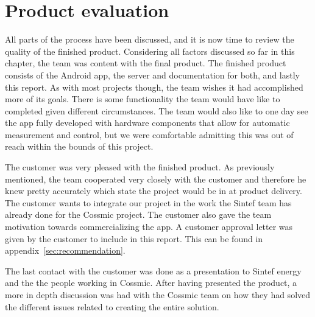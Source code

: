 \section{Product evaluation}
All parts of the process have been discussed, and it is now time to review the quality of the finished product. Considering all factors discussed so far in this chapter, the team was content with the final product. The finished product consists of the Android app, the server and documentation for both, and lastly this report. As with most projects though, the team wishes it had accomplished more of its goals. There is some functionality the team would have like to completed given different circumstances. The team would also like to one day see the app fully developed with hardware components that allow for automatic measurement and control, but we were comfortable admitting this was out of reach within the bounds of this project. 

The customer was very pleased with the finished product. As previously mentioned, the team cooperated very closely with the customer and therefore he knew pretty accurately which state the project would be in at product delivery. The customer wants to integrate our project in the work the Sintef team has already done for the Cossmic project. The customer also gave the team motivation towards commercializing the app. A customer approval letter was given by the customer to include in this report. This can be found in appendix~\ref{sec:recommendation}.

The last contact with the customer was done as a presentation to Sintef energy and the the people working in Cossmic. After having presented the product, a more in depth discussion was had with the Cossmic team on how they had solved the different issues related to creating the entire solution. 
